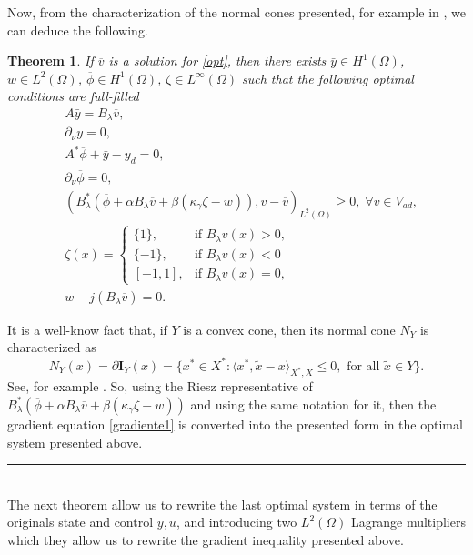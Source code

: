 \documentclass[11pt,a4paper]{amsart}
\newcommand{\kw}{\rule{2mm}{2mm}}
\newcommand{\om}{\Omega}
\renewenvironment{proof}{{Proof.}}{\hfill\kw}
\newtheorem{theorem}{{Theorem}}
\begin{document}
Now, from the characterization of the normal cones presented, for example in \cite{rock}, we can deduce the following.
\begin{theorem} 
	If $\overline{v}$ is a solution for \eqref{opt}, then there exists $\bar{y}\in H^1(\om)$, $\overline{w}\in L^2(\om)$, $\overline{\phi}\in H^1(\om)$, $\zeta\in L^\infty(\om)$ such that the following optimal conditions are full-filled
	\begin{equation}\label{optii1}
    \begin{split}
	&A\bar{y}=B_{\lambda}\overline{v}, \\
	&\partial_{\nu} y=0, \\
	&A^*\overline{\phi}+\bar{y}-y_d=0,\\
	&\partial_{\nu}\overline{\phi}=0,\\
	&(B_{
	\lambda}^*(\overline{\phi}+\alpha B_{\lambda}\overline{v}+\beta( \kappa_{\gamma}\zeta-w)),v-\overline{v})_{L^2(\om)}\ge 0, \;\forall v \in V_{ad},\\
	&\zeta(x)=\begin{cases}
		\{1\}, & \mbox{if }  B_{\lambda}v(x)>0,\\
		\{-1\}, & \mbox{if } B_{\lambda}v(x)<0\\
		 [-1,1], &\mbox{if }  B_{\lambda}v(x)=0,
	\end{cases}\\
	&w-j(B_{\lambda}\overline{v})=0.
\end{split}
\end{equation}
\end{theorem}

\begin{proof}
 It is a well-know fact that, if $Y$ is a convex cone, then its normal cone $N_{Y}$ is characterized as
\[
    N_{Y}(x)=\partial \mathbf{I}_{Y}(x)=\{x^*\in X^*:\langle x^*, \tilde{x}-x\rangle_{X^*,X}\le 0,  \mbox{ for all }\tilde{x}\in Y\}.
\]
See, for example \cite{rock}. So, using the Riesz representative of $B_{
	\lambda}^*(\overline{\phi}+\alpha B_{\lambda}\overline{v}+\beta( \kappa_{\gamma}\zeta-w))$ and using the same notation for it, then the gradient equation \eqref{gradiente1} is converted into the presented form in the optimal system presented above.
\end{proof}\\

The next theorem allow us to rewrite the last optimal system in terms of the originals state and control $y, u$, and introducing two $L^{2}(\om)$ Lagrange multipliers which they allow us to rewrite the gradient inequality presented above.
\end{document}
